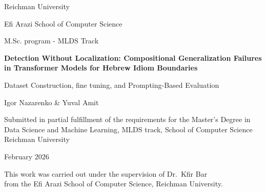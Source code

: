 \documentclass[11pt, a4paper]{report}
\begin{document}
\begin{titlepage}
    \centering
    \vspace*{2cm} %

    {\Large Reichman University \par}
    \vspace{0.3cm}
    {\large Efi Arazi School of Computer Science \par}
    {\large M.Sc. program - MLDS Track \par}

    \vfill

    {\LARGE \bfseries Detection Without Localization: Compositional Generalization Failures in Transformer Models for Hebrew Idiom Boundaries \par}
    \vspace{0.5cm}
    {\large Dataset Construction, fine tuning, and Prompting-Based Evaluation \par}

    \vfill

    {\Large Igor Nazarenko \& Yuval Amit \par}

    \vfill

    \centering
    {\normalsize
        Submitted in partial fulfillment of the requirements for the Master's Degree in \\ Data Science and Machine Learning, MLDS track, School of Computer Science\\
        Reichman University \\
    \par}

    \vspace{1.5cm}

    {\Large February 2026 \par}

    \vspace{1.5cm}

    {\normalsize This work was carried out under the supervision of Dr.\ Kfir Bar \\ from the Efi Arazi School of Computer Science, Reichman University. \par}

\end{titlepage}




\end{document}
